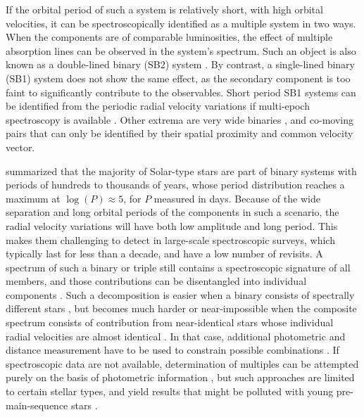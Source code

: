 If the orbital period of such a system is relatively short, with high orbital velocities, it can be spectroscopically identified as a multiple system in two ways. When the components are of comparable luminosities, the effect of multiple absorption lines can be observed in the system's spectrum. Such an object is also known as a double-lined binary (SB2) system \citep{2004A&A...424..727P, 2010AJ....140..184M, 2017PASP..129h4201F, 2017A&A...608A..95M}. By contrast, a single-lined binary (SB1) system does not show the same effect, as the secondary component is too faint to significantly contribute to the observables. Short period SB1 systems can be identified from the periodic radial velocity variations if multi-epoch spectroscopy is available \citep{1991A&A...248..485D, 2004A&A...418..989N, 2011AJ....141..200M, 2016AJ....151...85T, 2018ApJ...854..147B}. Other extrema are very wide binaries \citep{1988ApJ...335L..47G, 1990AJ....100.1968C, 1995ApJ...441..200G, 2009ApJ...703.1511K, 2011ApJS..192....2S, 2017MNRAS.472..675A, 2018MNRAS.480.4302C}, and co-moving pairs \citep{2017AJ....153..257O, 2019AJ....157...78J} that can only be identified by their spatial proximity and common velocity vector.

\citet{2013ARA&A..51..269D} summarized that the majority of Solar-type stars are part of binary systems with periods of hundreds to thousands of years, whose period distribution reaches a maximum at $\log(P)\approx5$, for $P$ measured in days. Because of the wide separation and long orbital periods of the components in such a scenario, the radial velocity variations will have both low amplitude and long period. This makes them challenging to detect in large-scale spectroscopic surveys, which typically last for less than a decade, and have a low number of revisits. A spectrum of such a binary or triple still contains a spectroscopic signature of all members, and those contributions can be disentangled into individual components \citep{2018MNRAS.473.5043E, 2018MNRAS.476..528E}. Such a decomposition is easier when a binary consists of spectrally different stars \citep{2005A&A...440..995S, 2007MNRAS.382.1377R, 2012MNRAS.419..806R, 2013AJ....146...82R, 2016MNRAS.458.3808R}, but becomes much harder or near-impossible when the composite spectrum consists of contribution from near-identical stars whose individual radial velocities are almost identical \citep{2015IJAsB..14..173B}. In that case, additional photometric and distance measurement have to be used to constrain possible combinations \citep{2018ApJ...857..114W}. If spectroscopic data are not available, determination of multiples can be attempted purely on the basis of photometric information \citep{1997A&A...327..598F, 1998MNRAS.300..977H, 2016MNRAS.455.3009M, 2018ApJ...857..114W}, but such approaches are limited to certain stellar types, and yield results that might be polluted with young pre-main-sequence stars \citep{2018arXiv181010435Z}.


